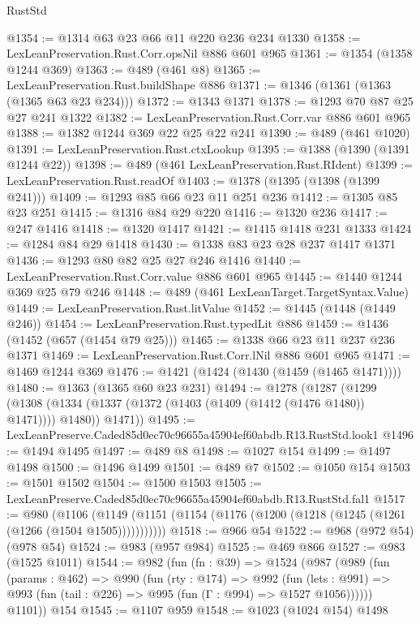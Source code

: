 \begin{lexlean}{RustStd}
\begin{coremodule}
@1354 := @1314 @63 @23 @66 @11 @220 @236 @234 @1330
@1358 := LexLeanPreservation.Rust.Corr.opsNil @886 @601 @965
@1361 := @1354 (@1358 @1244 @369)
@1363 := @489 (@461 @8)
@1365 := LexLeanPreservation.Rust.buildShape @886
@1371 := @1346 (@1361 (@1363 (@1365 @63 @23 @234)))
@1372 := @1343 @1371
@1378 := @1293 @70 @87 @25 @27 @241 @1322
@1382 := LexLeanPreservation.Rust.Corr.var @886 @601 @965
@1388 := @1382 @1244 @369 @22 @25 @22 @241
@1390 := @489 (@461 @1020)
@1391 := LexLeanPreservation.Rust.ctxLookup
@1395 := @1388 (@1390 (@1391 @1244 @22))
@1398 := @489 (@461 LexLeanPreservation.Rust.RIdent)
@1399 := LexLeanPreservation.Rust.readOf
@1403 := @1378 (@1395 (@1398 (@1399 @241)))
@1409 := @1293 @85 @66 @23 @11 @251 @236
@1412 := @1305 @85 @23 @251
@1415 := @1316 @84 @29 @220
@1416 := @1320 @236
@1417 := @247 @1416
@1418 := @1320 @1417
@1421 := @1415 @1418 @231 @1333
@1424 := @1284 @84 @29 @1418
@1430 := @1338 @83 @23 @28 @237 @1417 @1371
@1436 := @1293 @80 @82 @25 @27 @246 @1416
@1440 := LexLeanPreservation.Rust.Corr.value @886 @601 @965
@1445 := @1440 @1244 @369 @25 @79 @246
@1448 := @489 (@461 LexLeanTarget.TargetSyntax.Value)
@1449 := LexLeanPreservation.Rust.litValue
@1452 := @1445 (@1448 (@1449 @246))
@1454 := LexLeanPreservation.Rust.typedLit @886
@1459 := @1436 (@1452 (@657 (@1454 @79 @25)))
@1465 := @1338 @66 @23 @11 @237 @236 @1371
@1469 := LexLeanPreservation.Rust.Corr.lNil @886 @601 @965
@1471 := @1469 @1244 @369
@1476 := @1421 (@1424 (@1430 (@1459 (@1465 @1471))))
@1480 := @1363 (@1365 @60 @23 @231)
@1494 := @1278
    (@1287
      (@1299
        (@1308 (@1334 (@1337 (@1372 (@1403 (@1409 (@1412 (@1476 @1480)) @1471)))) @1480))
        @1471))
@1495 := LexLeanPreserve.Caded85d0ec70c96655a45904ef60abdb.R13.RustStd.look1
@1496 := @1494 @1495
@1497 := @489 @8
@1498 := @1027 @154
@1499 := @1497 @1498
@1500 := @1496 @1499
@1501 := @489 @7
@1502 := @1050 @154
@1503 := @1501 @1502
@1504 := @1500 @1503
@1505 := LexLeanPreserve.Caded85d0ec70c96655a45904ef60abdb.R13.RustStd.fal1
@1517 := @980
    (@1106 (@1149 (@1151 (@1154 (@1176 (@1200 (@1218 (@1245 (@1261 (@1266 (@1504 @1505)))))))))))
@1518 := @966 @54
@1522 := @968 (@972 @54) (@978 @54)
@1524 := @983 (@957 @984)
@1525 := @469 @866
@1527 := @983 (@1525 @1011)
@1544 := @982
    (fun (fn : @39) =>
    @1524
      (@987
        (@989
          (fun (params : @462) =>
          @990
            (fun (rty : @174) =>
            @992
              (fun (lets : @991) =>
              @993 (fun (tail : @226) => @995 (fun (Γ : @994) => @1527 @1056))))))
        @1101))
    @154
@1545 := @1107 @959
@1548 := @1023 (@1024 @154) @1498

\end{coremodule}
\end{lexlean}
